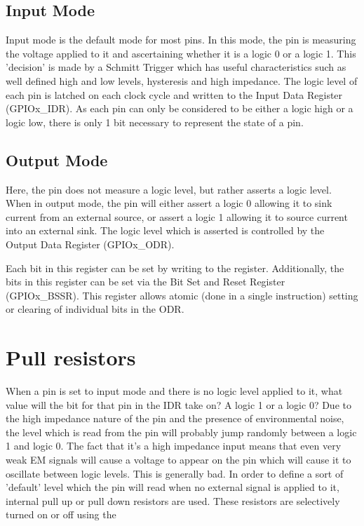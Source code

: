 \subsection{Input Mode}
Input mode is the default mode for most pins. In this mode, the pin is measuring the voltage applied to it and ascertaining whether it is a logic 0 or a logic 1. This 'decision' is made by a Schmitt Trigger which has useful characteristics such as well defined high and low levels, hysteresis and high impedance. The logic level of each pin is latched on each clock cycle and written to the Input Data Register (GPIOx\_IDR). As each pin can only be considered to be either a logic high or a logic low, there is only 1 bit necessary to represent the state of a pin.

\subsection{Output Mode}
Here, the pin does not measure a logic level, but rather asserts a logic level. When in output mode, the pin will either assert a logic 0 allowing it to sink current from an external source, or assert a logic 1 allowing it to source current into an external sink. The logic level which is asserted is controlled by the Output Data Register (GPIOx\_ODR). 

Each bit in this register can be set by writing to the register. Additionally, the bits in this register can be set via the Bit Set and Reset Register (GPIOx\_BSSR). This register allows atomic (done in a single instruction) setting or clearing of individual bits in the ODR. 

\section{Pull resistors}
When a pin is set to input mode and there is no logic level applied to it, what value will the bit for that pin in the IDR take on? A logic 1 or a logic 0? Due to the high impedance nature of the pin and the presence of environmental noise, the level which is read from the pin will probably jump randomly between a logic 1 and logic 0. The fact that it's a high impedance input means that even very weak EM signals will cause a voltage to appear on the pin which will cause it to oscillate between logic levels. This is generally bad. In order to define a sort of 'default' level which the pin will read when no external signal is applied to it, internal pull up or pull down resistors are used. These resistors are selectively turned on or off using the 

